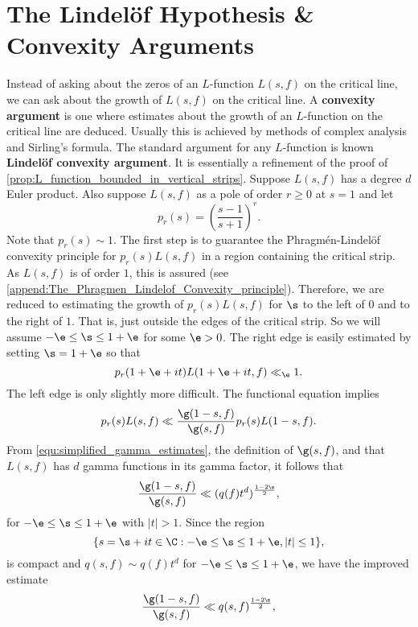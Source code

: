   \section{The Lindel\"of Hypothesis \& Convexity Arguments}
    Instead of asking about the zeros of an $L$-function $L(s,f)$ on the critical line, we can ask about the growth of $L(s,f)$ on the critical line. A \textbf{convexity argument} is one where estimates about the growth of an $L$-function on the critical line are deduced. Usually this is achieved by methods of complex analysis and Sirling's formula. The standard argument for any $L$-function is known \textbf{Lindel\"of convexity argument}. It is essentially a refinement of the proof of \cref{prop:L_function_bounded_in_vertical_strips}. Suppose $L(s,f)$ has a degree $d$ Euler product. Also suppose $L(s,f)$ as a pole of order $r \ge 0$ at $s = 1$ and let
    \[
      p_{r}(s) = \left(\frac{s-1}{s+1}\right)^{r}.
    \]
    Note that $p_{r}(s) \sim 1$. The first step is to guarantee the Phragm\'en-Lindel\"of convexity principle for $p_{r}(s)L(s,f)$ in a region containing the critical strip. As $L(s,f)$ is of order $1$, this is assured (see \cref{append:The_Phragmen_Lindelof_Convexity_principle}). Therefore, we are reduced to estimating the growth of $p_{r}(s)L(s,f)$ for $\s$ to the left of $0$ and to the right of $1$. That is, just outside the edges of the critical strip. So we will assume $-\e \le \s \le 1+\e$ for some $\e > 0$. The right edge is easily estimated by setting $\s = 1+\e$ so that
    \begin{equation}\label{equ:convexity_bound_1}
      p_{r}(1+\e+it)L(1+\e+it,f) \ll_{\e} 1.
    \end{equation}
    The left edge is only slightly more difficult. The functional equation implies
    \begin{equation}\label{equ:convexity_bound_left_edge}
      p_{r}(s)L(s,f) \ll \frac{\g(1-s,f)}{\g(s,f)}p_{r}(s)L(1-s,f).
    \end{equation}
    From \cref{equ:simplified_gamma_estimates}, the definition of $\g(s,f)$, and that $L(s,f)$ has $d$ gamma functions in its gamma factor, it follows that
    \[
      \frac{\g(1-s,f)}{\g(s,f)} \ll (q(f)t^{d})^{\frac{1-2\s}{2}},
    \]
    for $-\e \le \s \le 1+\e$ with $|t| > 1$. Since the region
    \[
      \{s = \s+it \in \C:-\e \le \s \le 1+\e,|t| \le 1\},
    \]
    is compact and $q\left(s,f\right) \sim q(f)t^{d}$ for $-\e \le \s \le 1+\e$, we have the improved estimate
    \begin{equation}\label{equ:ratio_gamma_factor_explicit}
      \frac{\g(1-s,f)}{\g(s,f)} \ll q(s,f)^{\frac{1-2\s}{2}},
    \end{equation}

